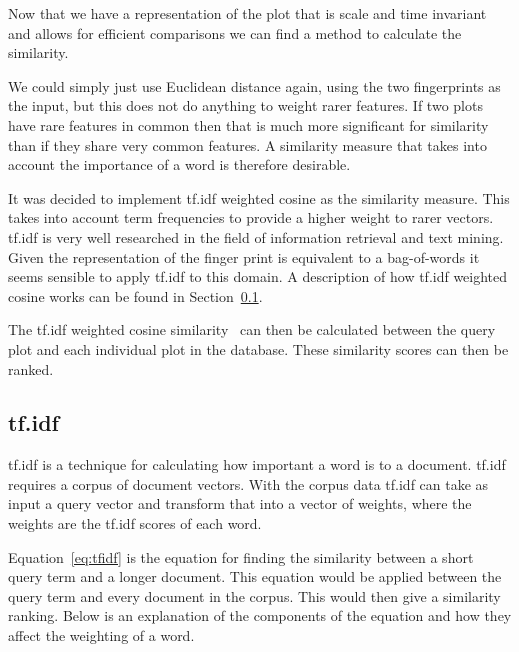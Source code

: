 Now that we have a representation of the plot that is scale and time invariant and allows for efficient comparisons we can find a method to calculate the similarity.

We could simply just use Euclidean distance again, using the two fingerprints as the input, but this does not do anything to weight rarer features.  If two plots have rare features in common then that is much more significant for similarity than if they share very common features.  A similarity measure that takes into account the importance of a word is therefore desirable.

It was decided to implement tf.idf weighted cosine as the similarity measure.  This takes into account term frequencies to provide a higher weight to rarer vectors.  tf.idf is very well researched in the field of information retrieval and text mining.  Given the representation of the finger print is equivalent to a bag-of-words it seems sensible to apply tf.idf to this domain.  A description of how tf.idf weighted cosine works can be found in Section~\ref{sec:tfidf}.

The tf.idf weighted cosine similarity~\cite[p.~243]{se_book} can then be calculated between the query plot and each individual plot in the database.  These similarity scores can then be ranked.

\subsection{tf.idf}
\label{sec:tfidf}

\ac{tf.idf} is a technique for calculating how important a word is to a document.  \ac{tf.idf} requires a corpus of document vectors.  With the corpus data \ac{tf.idf} can take as input a query vector and transform that into a vector of weights, where the weights are the \ac{tf.idf} scores of each word.


Equation~\ref{eq:tfidf} is the equation for finding the similarity between a short query term and a longer document.  This equation would be applied between the query term and every document in the corpus.  This would then give a similarity ranking.  Below is an explanation of the components of the equation and how they affect the weighting of a word.


